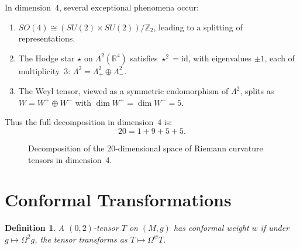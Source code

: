 \documentclass[11pt,a4paper]{article}
\newtheorem{definition}[theorem]{Definition}
\begin{document}
In dimension~$4$, several exceptional phenomena occur:

\begin{enumerate}
  \item $SO(4) \cong (SU(2) \times SU(2))/\mathbb{Z}_2$, leading to a
    splitting of representations.
  \item The Hodge star $\star$ on $\Lambda^2(\mathbb{R}^4)$ satisfies
    $\star^2 = \mathrm{id}$, with eigenvalues $\pm 1$, each of
    multiplicity~$3$: $\Lambda^2 = \Lambda^2_+ \oplus \Lambda^2_-$.
  \item The Weyl tensor, viewed as a symmetric endomorphism of $\Lambda^2$,
    splits as $W = W^+ \oplus W^-$ with
    $\dim W^+ = \dim W^- = 5$.
\end{enumerate}

Thus the full decomposition in dimension~$4$ is:
\[
  20 = 1 + 9 + 5 + 5.
\]

\begin{figure}[ht]
\centering
{}
\caption{Decomposition of the 20-dimensional space of Riemann
curvature tensors in dimension~4.}
\label{fig:decomp}
\end{figure}

\section{Conformal Transformations}
\label{sec:conformal}

\begin{definition}
A $(0,2)$-tensor $T$ on $(M,g)$ has \emph{conformal weight} $w$ if
under $g \mapsto \Omega^2 g$, the tensor transforms as
$T \mapsto \Omega^w T$.
\end{definition}
\end{document}
